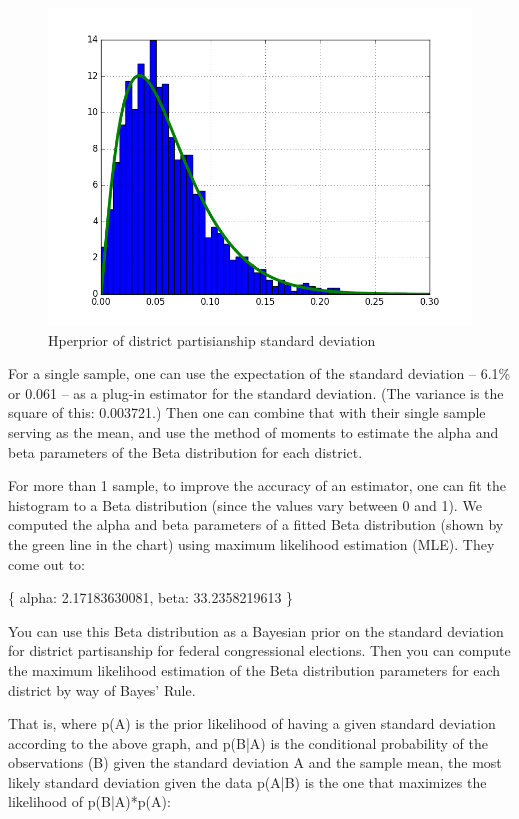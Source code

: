 \documentclass[preprint,12pt]{article}
\begin{document}
\begin{figure}[htb!]
    \begin{center}
        \includegraphics[scale=0.6]{../Figures/WI2010/hyperprior.png}
        \caption{Hperprior of district partisianship standard deviation}\label{fig:Hyperprior}
    \end{center}
\end{figure}
 
For a single sample, one can use the expectation of the standard deviation -- 6.1\% or 0.061 -- as a plug-in estimator for the standard deviation. (The variance is the square of this: 0.003721.)  Then one can combine that with their single sample serving as the mean, and use the method of moments to estimate the alpha and beta parameters of the Beta distribution for each district.
 
For more than 1 sample, to improve the accuracy of an estimator, one can fit the histogram to a Beta distribution (since the values vary between 0 and 1).  We computed the alpha and beta parameters of a fitted Beta distribution (shown by the green line in the chart) using maximum likelihood estimation (MLE). They come out to:
 
\{ alpha: 2.17183630081, beta: 33.2358219613 \}
 
You can use this Beta distribution as a Bayesian prior on the standard deviation for district partisanship for federal congressional elections.  Then you can compute the maximum likelihood estimation of the Beta distribution parameters for each district by way of Bayes' Rule.  
 
That is, where p(A) is the prior likelihood of having a given standard deviation according to the above graph, and p(B|A) is the conditional probability of the observations (B) given the standard deviation A and the sample mean, the most likely standard deviation given the data p(A|B) is the one that maximizes the likelihood of p(B|A)*p(A): 
\end{document}
